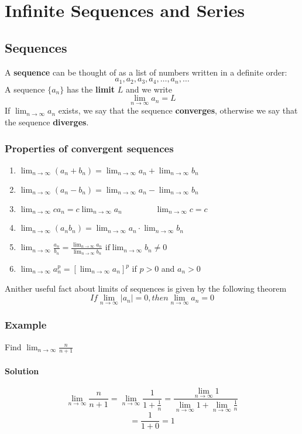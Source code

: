 \setcounter{chapter}{11}
\chapter{Infinite Sequences and Series}

\section{Sequences}
A \textbf{sequence} can be thought of as a list of numbers written in a definite order:
$$a_1, a_2, a_3, a_4, \dots, a_n, \dots$$
A sequence $\{a_n\}$ has the \textbf{limit} $L$ and we write $$\lim_{n\rightarrow\infty}a_n = L$$
If $\lim_{n\rightarrow\infty}a_n$ exists, we say that the sequence \textbf{converges}, otherwise we say that the sequence \textbf{diverges}.
\subsection*{Properties of convergent sequences}
\begin{enumerate}
    \item $\lim_{n\rightarrow\infty}(a_n + b_n) = \lim_{n\rightarrow\infty}a_n + \lim_{n\rightarrow\infty}b_n$
    \item $\lim_{n\rightarrow\infty}(a_n - b_n) = \lim_{n\rightarrow\infty}a_n - \lim_{n\rightarrow\infty}b_n$
    \item $\lim_{n\rightarrow\infty}ca_n = c\lim_{n\rightarrow\infty}a_n\qquad\qquad\lim_{n\rightarrow\infty}c = c$
    \item $\lim_{n\rightarrow\infty}(a_nb_n) = \lim_{n\rightarrow\infty}a_n\cdot\lim_{n\rightarrow\infty}b_n$
    \item $\lim_{n\rightarrow\infty}\frac{a_n}{b_n} = \frac{\lim_{n\rightarrow\infty}a_n}{\lim_{n\rightarrow\infty}b_n}$ $\text{if} \lim_{n\rightarrow\infty}b_n\neq 0$
    \item $\lim_{n\rightarrow\infty}a^p_n = [\lim_{n\rightarrow\infty}a_n]^p$ if $p > 0$ and $a_n > 0$
\end{enumerate}
Anither useful fact about limits of sequences is given by the following theorem $$If \lim_{n\rightarrow\infty}|a_n| = 0, then \lim_{n\rightarrow\infty}a_n = 0$$

\subsection*{Example}
Find $\lim_{n\rightarrow\infty}\frac{n}{n + 1}$
\subsubsection*{Solution}
$$\lim_{n\rightarrow\infty}\frac{n}{n + 1} = \lim_{n\rightarrow\infty}\frac{1}{1 + \frac{1}{n}} = \frac{\lim_{n\rightarrow\infty}1}{\lim_{n\rightarrow\infty}1 + \lim_{n\rightarrow\infty}\frac{1}{n}}$$
$$= \frac{1}{1 + 0} = 1$$


